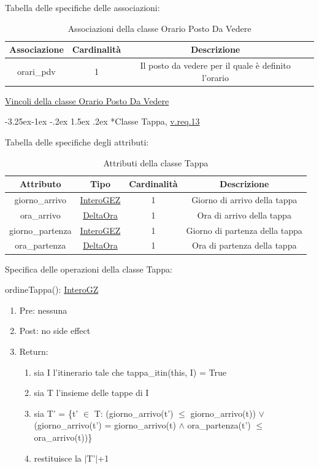 \documentclass{article}
\makeatletter
\renewcommand\subsection{\@startsection{subsection}{2}{\z@}%
                                     {-3.25ex\@plus -1ex \@minus -.2ex}%
                                     {1.5ex \@plus .2ex}%
                                     {\normalfont\normalsize\bfseries}}
\makeatother
\begin{document}
Tabella delle specifiche delle associazioni:
\begin{table}[h!]
    \centering
    \begin{tabular}{|c|c|c|c|}
        \hline
        Associazione & Cardinalità & Descrizione \\
        \hline
        orari\_pdv & 1 & Il posto da vedere per il quale è definito l'orario \\
        \hline
    \end{tabular}
    \caption{Associazioni della classe Orario Posto Da Vedere}
\end{table}

\hyperref[sec:VincoliOrarioPostoDaVedere]{Vincoli della classe Orario Posto Da Vedere}

\subsection*{Classe Tappa, \hyperref[sec:RequisitiTappa]{v.req.13}}\label{sec:Tappa}

Tabella delle specifiche degli attributi:
\begin{table}[h!]
    \centering
    \begin{tabular}{|c|c|c|c|}
        \hline
        Attributo & Tipo & Cardinalità & Descrizione \\
        \hline
        giorno\_arrivo & \hyperref[sec:InteroGEZ]{InteroGEZ} & 1 & Giorno di arrivo della tappa \\
        ora\_arrivo & \hyperref[sec:DeltaOra]{DeltaOra} & 1 & Ora di arrivo della tappa \\
        giorno\_partenza & \hyperref[sec:InteroGEZ]{InteroGEZ} & 1 & Giorno di partenza della tappa \\
        ora\_partenza & \hyperref[sec:DeltaOra]{DeltaOra} & 1 & Ora di partenza della tappa \\
        \hline
    \end{tabular}
    \caption{Attributi della classe Tappa}
\end{table}

Specifica delle operazioni della classe Tappa:

ordineTappa(): \hyperref[sec:InteroGZ]{InteroGZ}
\begin{enumerate}
    \item Pre: nessuna
    \item Post: no side effect
    \item Return:
    \begin{enumerate}
        \item sia I l'itinerario tale che tappa\_itin(this, I) = True
        \item sia T l'insieme delle tappe di I
        \item sia T' = \{t' $\in$ T: (giorno\_arrivo(t') $\leq$ giorno\_arrivo(t)) \newline $\lor$ (giorno\_arrivo(t') = giorno\_arrivo(t) $\land$ ora\_partenza(t') $\leq$ ora\_arrivo(t))\}
        \item restituisce la $|$T'$|$+1
    \end{enumerate}
\end{enumerate}
\end{document}
